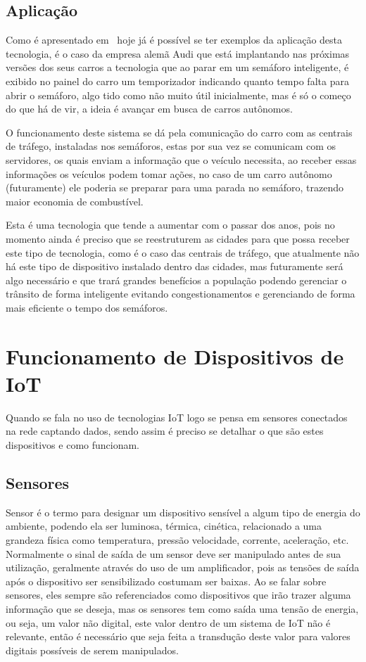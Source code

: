 \subsection{Aplicação}
\label{subsec:aplicacao}
Como é apresentado em~\cite{tecmundo} hoje já é possível se ter exemplos da aplicação desta tecnologia, é o caso da empresa alemã Audi que está implantando nas próximas versões dos seus carros a tecnologia que ao parar em um semáforo inteligente, é exibido no painel do carro um temporizador indicando quanto tempo falta para abrir o semáforo, algo tido como não muito útil inicialmente, mas é só o começo do que há de vir, a ideia é avançar em busca de carros autônomos. 

O funcionamento deste sistema se dá pela comunicação do carro com as centrais de tráfego, instaladas nos semáforos, estas por sua vez se comunicam com os servidores, os quais enviam a informação que o veículo necessita, ao receber essas informações os veículos podem tomar ações, no caso de um carro autônomo (futuramente) ele poderia se preparar para uma parada no semáforo, trazendo maior economia de combustível.

Esta é uma tecnologia que tende a aumentar com o passar dos anos, pois no momento ainda é preciso que se reestruturem as cidades para que possa receber este tipo de tecnologia, como é o caso das centrais de tráfego, que atualmente não há este tipo de dispositivo instalado dentro das cidades, mas futuramente será algo necessário e que trará grandes benefícios a população podendo gerenciar o trânsito de forma inteligente evitando congestionamentos e gerenciando de forma mais eficiente o tempo dos semáforos.

\section{Funcionamento de Dispositivos de IoT}
\label{sec:dispositivosiot}
Quando se fala no uso de tecnologias IoT logo se pensa em sensores conectados na rede captando dados, sendo assim é preciso se detalhar o que são estes dispositivos e como funcionam.

\subsection{Sensores}
\label{subsec:sensores}
Sensor é o termo para designar um dispositivo sensível a algum tipo de energia do ambiente, podendo ela ser luminosa, térmica, cinética, relacionado a uma grandeza física como temperatura, pressão velocidade, corrente, aceleração, etc. Normalmente o sinal de saída de um sensor deve ser manipulado antes de sua utilização, geralmente através do uso de um amplificador, pois as tensões de saída após o dispositivo ser sensibilizado costumam ser baixas. Ao se falar sobre sensores, eles sempre são referenciados como dispositivos que irão trazer alguma informação que se deseja, mas os sensores tem como saída uma tensão de energia, ou seja, um valor não digital, este valor dentro de um sistema de IoT não é relevante, então é necessário que seja feita a transdução deste valor para valores digitais possíveis de serem manipulados.~\cite{wendling2010}

